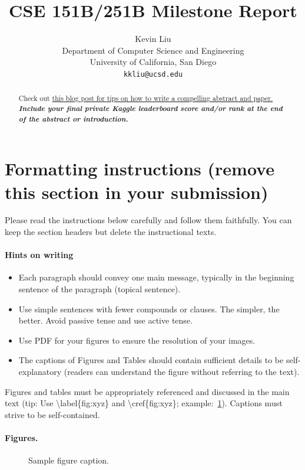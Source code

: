 \documentclass{article}
\title{
CSE 151B/251B Milestone Report
\\
}
\author{%
  Kevin Liu \\
  Department of Computer Science and Engineering \\
  University of California, San Diego \\
  \texttt{kkliu@ucsd.edu} \\
}
\begin{document}
\maketitle


\begin{abstract}
Check out \href{https://www.alignmentforum.org/posts/eJGptPbbFPZGLpjsp/highly-opinionated-advice-on-how-to-write-ml-papers#Abstract}{this blog post for tips on how to write a compelling abstract and paper.} \textbf{\textit{Include your final private Kaggle leaderboard score and/or rank at the end of the abstract or introduction.}}
\end{abstract}

\section*{Formatting instructions (remove this section in your submission)}
Please read the instructions below carefully and follow them faithfully. You can keep the section headers but delete the instructional texts.
\paragraph{Hints on writing}
\begin{itemize}
    \item Each paragraph should convey one main message, typically in the beginning sentence of the paragraph (topical sentence).
    \item  Use simple sentences with fewer compounds or clauses. The simpler, the better. Avoid passive tense and use active tense.
    \item Use PDF for your figures to ensure the resolution of your images.
    \item The captions of Figures and Tables should contain sufficient details to be self-explanatory (readers can understand the figure without referring to the text).
\end{itemize}


Figures and tables must be appropriately referenced and discussed in the main text (tip: Use \textbackslash label\{fig:xyz\} and \textbackslash cref\{fig:xyz\}; example:~\cref{fig:example}). Captions must strive to be self-contained.
\paragraph{Figures.}
\begin{figure} %
  \vspace{-4mm}  %
  \centering
  \fbox{\rule[-.5cm]{0cm}{4cm} \rule[-.5cm]{4cm}{0cm}}
  \caption{Sample figure caption.}
  \label{fig:example}
\end{figure}
\end{document}

